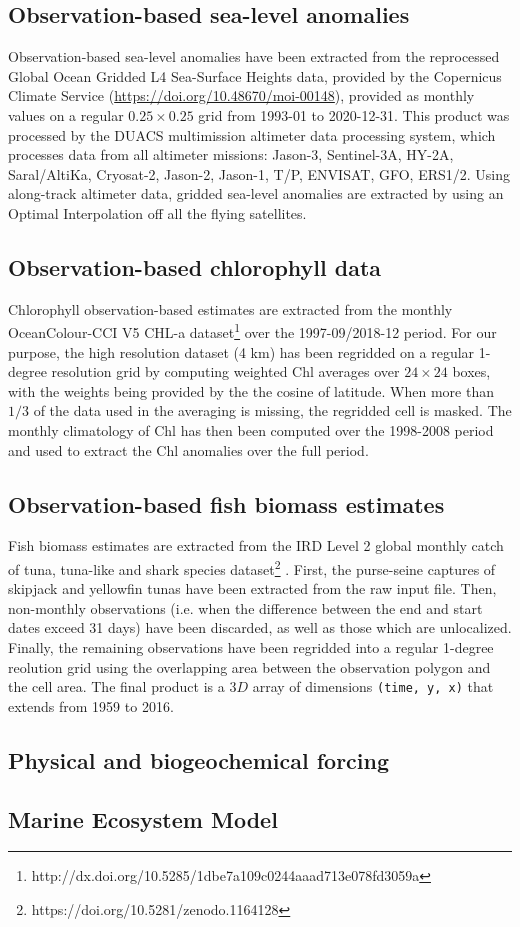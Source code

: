\subsection{Observation-based sea-level anomalies}

Observation-based sea-level anomalies have been extracted from the reprocessed Global Ocean Gridded L4 Sea-Surface Heights data, provided by the Copernicus Climate Service (\url{https://doi.org/10.48670/moi-00148}), provided as monthly values on a regular $0.25 \times 0.25$ grid from 1993-01 to 2020-12-31. This product was processed by the DUACS multimission altimeter data processing system, which processes data from all altimeter missions: Jason-3, Sentinel-3A, HY-2A, Saral/AltiKa, Cryosat-2, Jason-2, Jason-1, T/P, ENVISAT, GFO, ERS1/2. Using along-track altimeter data, gridded sea-level anomalies are extracted by using an Optimal Interpolation off all the flying satellites.

\subsection{Observation-based chlorophyll data}

Chlorophyll observation-based estimates are extracted from the monthly OceanColour-CCI V5 CHL-a dataset\footnote{http://dx.doi.org/10.5285/1dbe7a109c0244aaad713e078fd3059a}  \citep{sathyendranathOceanColourTimeSeries2019} over the 1997-09/2018-12 period. For our purpose, the high resolution dataset (4 km) has been regridded on a regular 1-degree resolution grid by computing weighted Chl averages over $24\times24$ boxes, with the weights being provided by the the cosine of latitude. When more than $1/3$ of the data used in the averaging is missing, the regridded cell is masked. The monthly climatology of Chl has then been computed over the 1998-2008 period and used to extract the Chl anomalies over the full period.

\subsection{Observation-based fish biomass estimates}

Fish biomass estimates are extracted from the IRD Level 2 global monthly catch of tuna, tuna-like and shark species dataset\footnote{https://doi.org/10.5281/zenodo.1164128} \citep{taconetGlobalMonthlyCatch2018}. First, the purse-seine captures of skipjack and yellowfin tunas have been extracted from the raw input file. Then, non-monthly observations (i.e. when the difference between the end and start dates exceed 31 days) have been discarded, as well as those which are unlocalized. Finally, the remaining observations have been regridded into a regular 1-degree reolution grid using the overlapping area between the observation polygon and the cell area. The final product is a $3D$ array of dimensions \verb+(time, y, x)+ that extends from 1959 to 2016.

\subsection{Physical and biogeochemical forcing}


\subsection{Marine Ecosystem Model}
